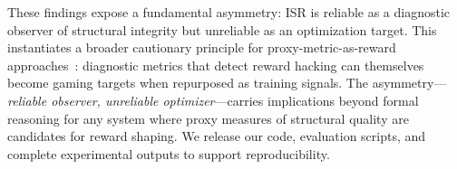 These findings expose a fundamental asymmetry: ISR is reliable as a diagnostic observer of structural integrity but unreliable as an optimization target.
This instantiates a broader cautionary principle for proxy-metric-as-reward approaches~\citep{manheim-goodhart-taxonomy, pan-reward-misspecification}: diagnostic metrics that detect reward hacking can themselves become gaming targets when repurposed as training signals.
The asymmetry---\emph{reliable observer, unreliable optimizer}---carries implications beyond formal reasoning for any system where proxy measures of structural quality are candidates for reward shaping.
We release our code, evaluation scripts, and complete experimental outputs to support reproducibility.
